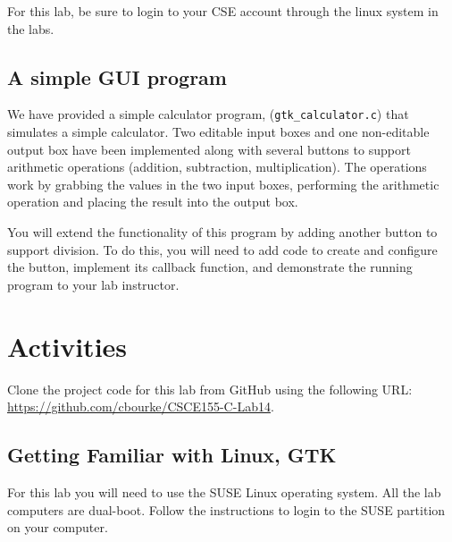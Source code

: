 \documentclass[12pt]{scrartcl}
\begin{document}
For this lab, be sure to login to your CSE account through the linux system in the labs.

\subsection*{A simple GUI program}

We have provided a simple calculator program, (\texttt{gtk_calculator.c}) 
that simulates a simple calculator.  Two editable input boxes 
and one non-editable output box have been implemented 
along with several buttons to support arithmetic operations 
(addition, subtraction, multiplication).  The operations work 
by grabbing the values in the two input boxes, performing 
the arithmetic operation and placing the result into the output 
box.

You will extend the functionality of this program by adding 
another button to support division.  To do this, you will need 
to add code to create and configure the button, implement 
its callback function, and demonstrate the running program 
to your lab instructor.

\section{Activities}

Clone the project code for this lab from GitHub using the following
URL: \url{https://github.com/cbourke/CSCE155-C-Lab14}.

\subsection{Getting Familiar with Linux, GTK}

For this lab you will need to use the SUSE Linux operating system.  
All the lab computers are dual-boot.  Follow the instructions to login 
to the SUSE partition on your computer.
\end{document}
